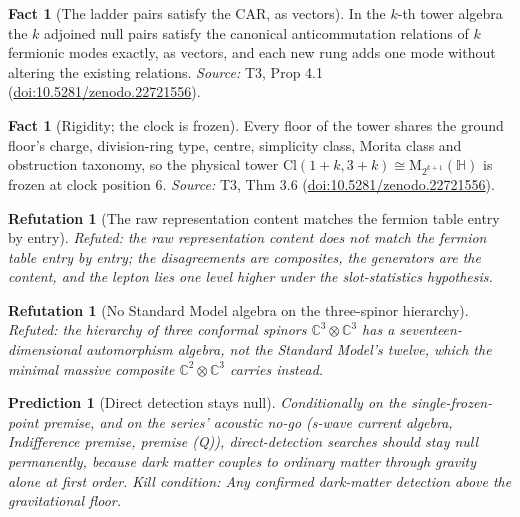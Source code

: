 \documentclass[11pt]{article}
\newtheorem{refutation}[theorem]{Refutation}
\newtheorem{prediction}[theorem]{Prediction}
\theoremstyle{definition}
\newtheorem{fact}[theorem]{Fact}
\theoremstyle{plain}
\providecommand{\C}{}\renewcommand{\C}{\mathbb{C}}
\providecommand{\Cl}{}\renewcommand{\Cl}{\mathrm{Cl}}
\providecommand{\HH}{}\renewcommand{\HH}{\mathbb{H}}
\providecommand{\Mat}{}\renewcommand{\Mat}{\mathrm{M}}
\begin{document}
\begin{fact}[The ladder pairs satisfy the CAR, as vectors]\label{c:tower.ladder-pairs-satisfy-car-vectors}
In the $k$-th tower algebra the $k$ adjoined null pairs satisfy the canonical anticommutation relations of $k$ fermionic modes exactly, as vectors, and each new rung adds one mode without altering the existing relations.
\emph{Source:} T3, Prop 4.1 (\href{https://doi.org/10.5281/zenodo.22721556}{doi:10.5281/zenodo.22721556}).
\end{fact}

\begin{fact}[Rigidity; the clock is frozen]\label{c:tower.rigidity-clock-frozen}
Every floor of the tower shares the ground floor's charge, division-ring type, centre, simplicity class, Morita class and obstruction taxonomy, so the physical tower $\Cl(1{+}k, 3{+}k) \cong \Mat_{2^{k+1}}(\HH)$ is frozen at clock position $6$.
\emph{Source:} T3, Thm 3.6 (\href{https://doi.org/10.5281/zenodo.22721556}{doi:10.5281/zenodo.22721556}).
\end{fact}

\begin{refutation}[The raw representation content matches the fermion table entry by entry]\label{c:refuted.the-raw-representation-content-matches-the-fermi}
Refuted: the raw representation content does not match the fermion table entry by entry; the disagreements are composites, the generators are the content, and the lepton lies one level higher under the slot-statistics hypothesis.
\end{refutation}

\begin{refutation}[No Standard Model algebra on the three-spinor hierarchy]\label{c:refuted.the-three-twistor-hierarchy-carries-the-standard}
Refuted: the hierarchy of three conformal spinors $\C^{3}\otimes\C^{3}$ has a seventeen-dimensional automorphism algebra, not the Standard Model's twelve, which the minimal massive composite $\C^{2}\otimes\C^{3}$ carries instead.
\end{refutation}

\begin{prediction}[Direct detection stays null]\label{c:pred.dark-matter-direct-detection-null}
Conditionally on the single-frozen-point premise, and on the series' acoustic no-go (s-wave current algebra, Indifference premise, premise (Q)), direct-detection searches should stay null permanently, because dark matter couples to ordinary matter through gravity alone at first order.
\emph{Kill condition:} Any confirmed dark-matter detection above the gravitational floor.
\end{prediction}
\end{document}
